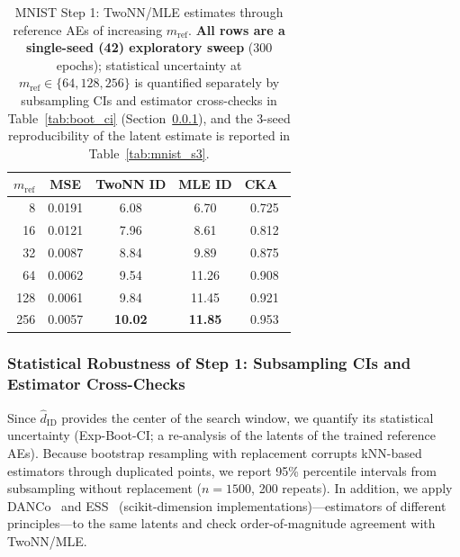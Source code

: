 \documentclass[make,article,submit,pdftex,moreauthors]{Definitions/mdpi}
\newcommand{\hatdID}{\hat{d}_{\mathrm{ID}}}
\begin{document}
\begin{table}[H]
\caption{MNIST Step 1: TwoNN/MLE estimates through reference AEs of
increasing $m_{\mathrm{ref}}$. \textbf{All rows are a single-seed (42)
exploratory sweep} (300 epochs); statistical uncertainty at
$m_{\mathrm{ref}} \in \{64, 128, 256\}$ is quantified separately by
subsampling CIs and estimator cross-checks in Table~\ref{tab:boot_ci}
(Section~\ref{sec:exp_mnist_ci}), and the 3-seed reproducibility of the
latent estimate is reported in Table~\ref{tab:mnist_s3}.}
\label{tab:mnist_s1}
\small
\begin{tabular}{rcccc}
\toprule
$m_{\mathrm{ref}}$ & \textbf{MSE} & \textbf{TwoNN ID} & \textbf{MLE ID} & \textbf{CKA}~\cite{kornblith2019cka} \\
\midrule
8   & 0.0191 & 6.08 & 6.70 & 0.725 \\
16  & 0.0121 & 7.96 & 8.61 & 0.812 \\
32  & 0.0087 & 8.84 & 9.89 & 0.875 \\
64  & 0.0062 & 9.54 & 11.26 & 0.908 \\
128 & 0.0061 & 9.84 & 11.45 & 0.921 \\
256 & 0.0057 & \textbf{10.02} & \textbf{11.85} & 0.953 \\
\bottomrule
\end{tabular}
\end{table}

\subsubsection{Statistical Robustness of Step 1: Subsampling CIs and Estimator Cross-Checks}
\label{sec:exp_mnist_ci}

Since $\hatdID$ provides the center of the search window, we quantify its
statistical uncertainty (Exp-Boot-CI; a re-analysis of the latents of the
trained reference AEs).
Because bootstrap resampling with replacement corrupts kNN-based estimators
through duplicated points, we report 95\% percentile intervals from
subsampling without replacement ($n = 1500$, 200 repeats).
In addition, we apply DANCo~\cite{ceruti2014danco} and
ESS~\cite{johnsson2015ess} (scikit-dimension implementations)---estimators
of different principles---to the same latents and check order-of-magnitude
agreement with TwoNN/MLE.
\end{document}
